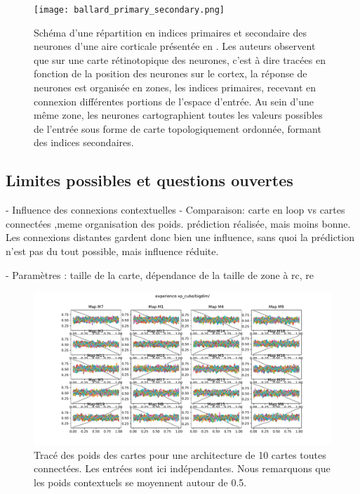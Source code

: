 \documentclass[../main]{subfiles}
\begin{document}
\begin{figure}
	\centering\texttt{[image: ballard\_primary\_secondary.png]}
	\caption{Schéma d'une répartition en indices primaires et secondaire des neurones d'une aire corticale présentée en \cite{ballard_cortical_1986}. Les auteurs observent que sur une carte rétinotopique des neurones, c'est à dire tracées en fonction de la position des neurones sur le cortex, la réponse de neurones est organisée en zones, les indices primaires, recevant en connexion différentes portions de l'espace d'entrée. Au sein d'une même zone, les neurones cartographient toutes les valeurs possibles de l'entrée sous forme de carte topologiquement ordonnée, formant des indices secondaires.\label{fig:ballard}}
\end{figure}

\subsection{Limites possibles et questions ouvertes}

- Influence des connexions contextuelles 
- Comparaison: carte en loop vs cartes connectées ,meme organisation des poids. prédiction réalisée, mais moins bonne. Les connexions distantes gardent donc bien une influence, sans quoi la prédiction n'est pas du tout possible, mais influence réduite.


- Paramètres : taille de la carte, dépendance de la taille de zone à rc, re


\begin{figure}
	\includegraphics[width=\textwidth]{xp_cube_bigdim.pdf}
	\caption{Tracé des poids des cartes pour une architecture de 10 cartes toutes connectées. Les entrées sont ici indépendantes. Nous remarquons que les poids contextuels se moyennent autour de 0.5.}
\end{figure}
\end{document}
